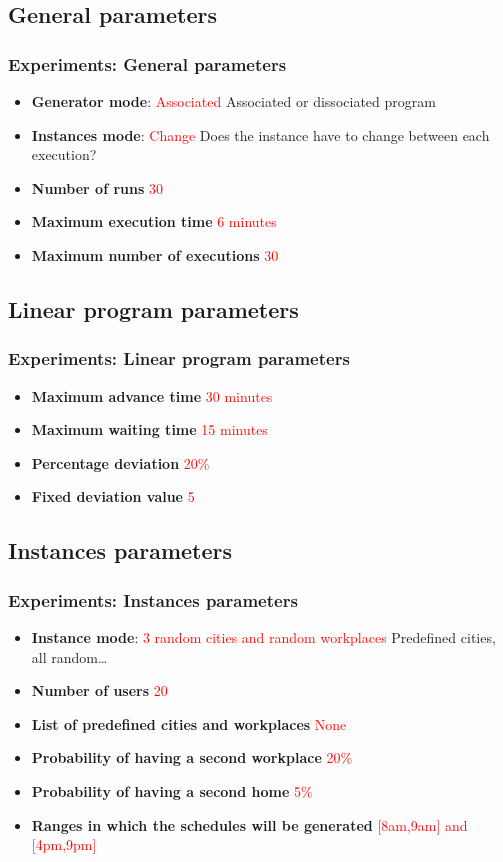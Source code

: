 \documentclass{beamer}
\begin{document}
	\subsection{General parameters}
	\begin{frame}
		\frametitle{Experiments: General parameters}
		\begin{itemize}
			\item \textbf{Generator mode}: \textcolor{red}{Associated} Associated or dissociated program
			\item \textbf{Instances mode}: \textcolor{red}{Change} Does the instance have to change between each execution?
			\item \textbf{Number of runs} \textcolor{red}{30}
			\item \textbf{Maximum execution time} \textcolor{red}{6 minutes}
			\item \textbf{Maximum number of executions} \textcolor{red}{30}
		\end{itemize}
	\end{frame}
	\subsection{Linear program parameters}
	\begin{frame}
		\frametitle{Experiments: Linear program parameters}
		\begin{itemize}
			\item \textbf{Maximum advance time} \textcolor{red}{30 minutes}
			\item \textbf{Maximum waiting time} \textcolor{red}{15 minutes}
			\item \textbf{Percentage deviation} \textcolor{red}{20\%}
			\item \textbf{Fixed deviation value} \textcolor{red}{5}
		\end{itemize}
	\end{frame}
	\subsection{Instances parameters}
	\begin{frame}
		\frametitle{Experiments: Instances parameters}
		\begin{itemize}
			\item \textbf{Instance mode}: \textcolor{red}{3 random cities and random workplaces} Predefined cities, all random\dots
			\item \textbf{Number of users} \textcolor{red}{20}
			\item \textbf{List of predefined cities and workplaces} \textcolor{red}{None}
			\item \textbf{Probability of having a second workplace} \textcolor{red}{20\%}
			\item \textbf{Probability of having a second home} \textcolor{red}{5\%}
			\item \textbf{Ranges in which the schedules will be generated } \textcolor{red}{[8am,9am] and [4pm,9pm]}
		\end{itemize}
	\end{frame}
\end{document}
